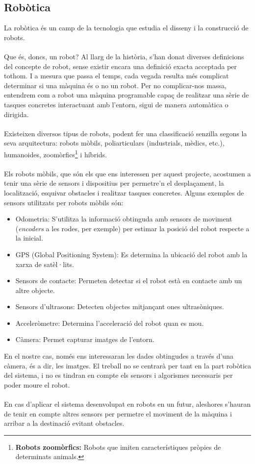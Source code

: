 	\subsection{Robòtica}
		La robòtica és un camp de la tecnologia que estudia el disseny i la construcció de robots.\\\\
		Que és, doncs, un robot? Al llarg de la història, s'han donat diverses definicions del concepte de robot, sense existir encara una definició exacta acceptada per tothom. I a mesura que passa el temps,
		cada vegada resulta més complicat determinar si una màquina és o no un robot. Per no complicar-nos massa, entendrem com a robot una màquina programable capaç de realitzar una sèrie de
		tasques concretes interactuant amb l'entorn, sigui de manera automàtica o dirigida.\\\\
		Existeixen diversos tipus de robots, podent fer una classificació senzilla segons la seva arquitectura: robots mòbils, poliarticulars (industrials, mèdics, etc.), humanoides, 
		zoomòrfics\footnote{\textbf{Robots zoomòrfics:} Robots que imiten característiques pròpies de determinats animals.} i híbrids.\\\\
		Els robots mòbils, que són els que ens interessen per aquest projecte, acostumen a tenir una sèrie de sensors i dispositius per permetre'n el desplaçament, la localització, esquivar obstacles i
		realitzar tasques concretes. Alguns exemples de sensors utilitzats per robots mòbils són:\\
		\begin{itemize}
			\item Odometria: S'utilitza la informació obtinguda amb sensors de moviment (\textit{encoders} a les rodes, per exemple) per estimar la posició del robot respecte a la inicial.
			\item GPS (Global Positioning System): Es determina la ubicació del robot amb la xarxa de satèl·lits.
			\item Sensors de contacte: Permeten detectar si el robot està en contacte amb un altre objecte.
			\item Sensors d'ultrasons: Detecten objectes mitjançant ones ultrasòniques.
			\item Acceleròmetre: Determina l'acceleració del robot quan es mou. 
			\item Càmera: Permet capturar imatges de l'entorn.\\
		\end{itemize}
		En el nostre cas, només ens interessaran les dades obtingudes a través d'una càmera, és a dir, les imatges. El treball no se centrarà per tant en la part robòtica del sistema, i no es tindran en compte
		els sensors i algorismes necessaris per poder moure el robot.\\\\
		En cas d'aplicar el sistema desenvolupat en robots en un futur, aleshores s'hauran de tenir en compte altres sensors per permetre el moviment
		de la màquina i arribar a la destinació evitant obstacles.
